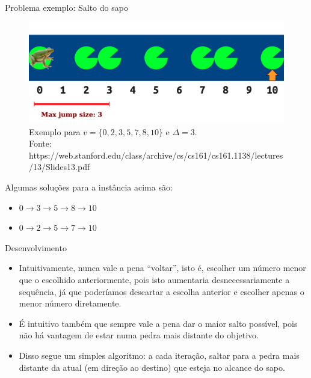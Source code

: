 \documentclass[final,hyperref={pdfpagelabels=false}]{beamer}
\begin{document}
\begin{frame}[t]
\begin{columns}[t]
\begin{column}{.465\textwidth}
\begin{block}{Problema exemplo: Salto do sapo}
\begin{figure}
\includegraphics[width=0.8\linewidth]{sapo.png}
\caption{Exemplo para $v = \{0, 2, 3, 5, 7, 8, 10\}$ e $\Delta = 3$.\\
Fonte: https://web.stanford.edu/class/archive/cs/cs161/cs161.1138/lectures/13/Slides13.pdf}
\end{figure}

Algumas soluções para a instância acima são:

\begin{itemize}
    \item $0 \rightarrow 3 \rightarrow 5 \rightarrow 8 \rightarrow 10$
    \item $0 \rightarrow 2 \rightarrow 5 \rightarrow 7 \rightarrow 10$
\end{itemize}

\end{block}


\begin{block}{Desenvolvimento}

\begin{itemize}
    \item Intuitivamente,  nunca vale a pena “voltar”, isto é, escolher um número menor que o escolhido anteriormente, pois isto aumentaria desnecessariamente a sequência, já que poderíamos descartar a escolha anterior e escolher apenas o menor número diretamente.
    \item É intuitivo também que sempre vale a pena dar o maior salto possível, pois não há vantagem de estar numa pedra mais distante do objetivo.
    \item Disso segue um simples algoritmo: a cada iteração, saltar para a pedra mais distante da atual (em direção ao destino) que esteja no alcance do sapo.
\end{itemize}

\end{block}


\end{column}
\end{columns}
\end{frame}
\end{document}

